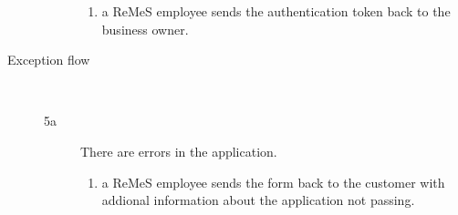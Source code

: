 \begin{description}
\begin{description}
		\begin{enumerate}
			\item a ReMeS employee sends the authentication token back to the business owner.
		\end{enumerate}
	\end{description}
	\item[Exception flow] \ 
	\begin{description}
		\item[5a] There are errors in the application.
		\begin{enumerate}
			\item a ReMeS employee sends the form back to the customer with addional
			information about the application not passing.
		\end{enumerate}
	\end{description}
\end{description}